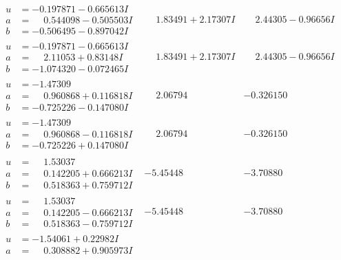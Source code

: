 \documentclass[1p]{elsarticle_modified}
\theoremstyle{definition}
\begin{document}
$$\begin{array}{c|c|c}
\begin{aligned}
u &= -0.197871 - 0.665613 I \\
a &= \phantom{-}0.544098 - 0.505503 I \\
b &= -0.506495 - 0.897042 I\end{aligned}
 & \phantom{-}1.83491 + 2.17307 I & \phantom{-}2.44305 - 0.96656 I \\ \hline\begin{aligned}
u &= -0.197871 - 0.665613 I \\
a &= \phantom{-}2.11053 + 0.83148 I \\
b &= -1.074320 - 0.072465 I\end{aligned}
 & \phantom{-}1.83491 + 2.17307 I & \phantom{-}2.44305 - 0.96656 I \\ \hline\begin{aligned}
u &= -1.47309\phantom{ +0.000000I} \\
a &= \phantom{-}0.960868 + 0.116818 I \\
b &= -0.725226 - 0.147080 I\end{aligned}
 & \phantom{-}2.06794\phantom{ +0.000000I} & -0.326150\phantom{ +0.000000I} \\ \hline\begin{aligned}
u &= -1.47309\phantom{ +0.000000I} \\
a &= \phantom{-}0.960868 - 0.116818 I \\
b &= -0.725226 + 0.147080 I\end{aligned}
 & \phantom{-}2.06794\phantom{ +0.000000I} & -0.326150\phantom{ +0.000000I} \\ \hline\begin{aligned}
u &= \phantom{-}1.53037\phantom{ +0.000000I} \\
a &= \phantom{-}0.142205 + 0.666213 I \\
b &= \phantom{-}0.518363 + 0.759712 I\end{aligned}
 & -5.45448\phantom{ +0.000000I} & -3.70880\phantom{ +0.000000I} \\ \hline\begin{aligned}
u &= \phantom{-}1.53037\phantom{ +0.000000I} \\
a &= \phantom{-}0.142205 - 0.666213 I \\
b &= \phantom{-}0.518363 - 0.759712 I\end{aligned}
 & -5.45448\phantom{ +0.000000I} & -3.70880\phantom{ +0.000000I} \\ \hline\begin{aligned}
u &= -1.54061 + 0.22982 I \\
a &= \phantom{-}0.308882 + 0.905973 I \\

\end{aligned}
\end{array}$$
\end{document}
